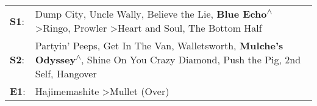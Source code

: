 \begin{supertabular}{p{0.03\textwidth}p{0.92\textwidth}}
 \textbf{S1}:  &   Dump City\textsuperscript{}, \enspace Uncle Wally\textsuperscript{}, \enspace Believe the Lie\textsuperscript{}, \enspace \textbf{Blue Echo\textsuperscript{$\wedge$}} \textgreater \enspace Ringo\textsuperscript{}, \enspace Prowler\textsuperscript{} \textgreater \enspace Heart and Soul\textsuperscript{}, \enspace The Bottom Half\textsuperscript{}  \enspace  \\
 \textbf{S2}:  &  Partyin' Peeps\textsuperscript{}, \enspace Get In The Van\textsuperscript{}, \enspace Walletsworth\textsuperscript{}, \enspace \textbf{Mulche's Odyssey\textsuperscript{$\wedge$}}, \enspace Shine On You Crazy Diamond\textsuperscript{}, \enspace Push the Pig\textsuperscript{}, \enspace 2nd Self\textsuperscript{}, \enspace Hangover\textsuperscript{}  \enspace  \\
 \textbf{E1}:  &                                                                                                                                                                                                                                                                         Hajimemashite\textsuperscript{} \textgreater \enspace Mullet (Over)\textsuperscript{}  \enspace  \\
\end{supertabular}
